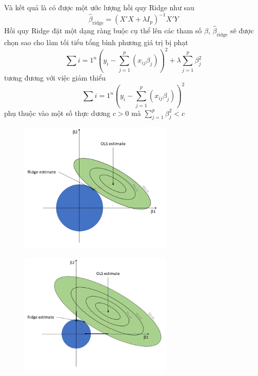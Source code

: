 \documentclass{article}
\begin{document}
	Và kết quả là có được một ước lượng hồi quy Ridge như sau
	$$\hat{\beta}_{\text{ridge}} = (X'X + \lambda I_p)^{-1}X'Y$$
	Hồi quy Ridge đặt một dạng ràng buộc cụ thể lên các tham số $\beta$, $\hat{\beta}_{\text{ridge}}$ sẽ được chọn sao cho làm tối tiểu tổng bình phương giá trị bị phạt
	$$\sum{i=1}^{n}\left(y_i - \sum_{j=1}^p(x_{ij}\beta_{j})\right)^2 + \lambda\sum_{j=1}^{p}\beta_j^2$$
	tương đương với việc giảm thiểu 
	$$\sum{i=1}^{n}\left(y_i - \sum_{j=1}^p(x_{ij}\beta_{j})\right)^2$$ phụ thuộc vào một số thực dương $c > 0$ mà $\sum_{j=1}^{p}\beta_j^2 < c$
	\begin{figure}[H]
		\centering
		\includegraphics[width=0.65\textwidth]{images/ridge_reg/ridge_geometric.png}
	\end{figure}
	\begin{figure}[H]
		\centering
		\includegraphics[width=0.65\textwidth]{images/ridge_reg/ridge_geometric_2.png}
	\end{figure}
\end{document}
